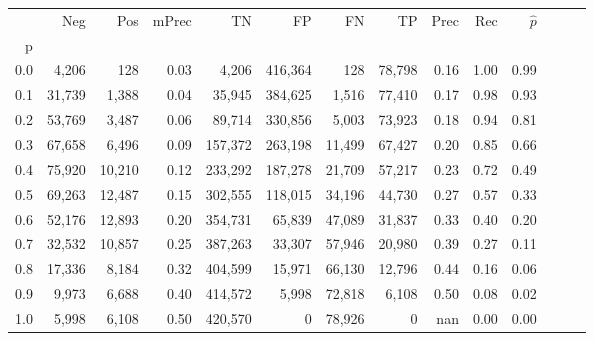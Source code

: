 \begin{tabular}{rrrrrrrrrrrrrr}
\toprule
{} &     Neg &     Pos & mPrec &       TN &       FP &      FN &      TP &  Prec &   Rec & $\hat{p}$ \\
p   &         &         &       &          &          &         &         &       &       &           \\
\midrule
0.0 &   4,206 &     128 &  0.03 &    4,206 &  416,364 &     128 &  78,798 &  0.16 &  1.00 &      0.99 \\
0.1 &  31,739 &   1,388 &  0.04 &   35,945 &  384,625 &   1,516 &  77,410 &  0.17 &  0.98 &      0.93 \\
0.2 &  53,769 &   3,487 &  0.06 &   89,714 &  330,856 &   5,003 &  73,923 &  0.18 &  0.94 &      0.81 \\
0.3 &  67,658 &   6,496 &  0.09 &  157,372 &  263,198 &  11,499 &  67,427 &  0.20 &  0.85 &      0.66 \\
0.4 &  75,920 &  10,210 &  0.12 &  233,292 &  187,278 &  21,709 &  57,217 &  0.23 &  0.72 &      0.49 \\
0.5 &  69,263 &  12,487 &  0.15 &  302,555 &  118,015 &  34,196 &  44,730 &  0.27 &  0.57 &      0.33 \\
0.6 &  52,176 &  12,893 &  0.20 &  354,731 &   65,839 &  47,089 &  31,837 &  0.33 &  0.40 &      0.20 \\
0.7 &  32,532 &  10,857 &  0.25 &  387,263 &   33,307 &  57,946 &  20,980 &  0.39 &  0.27 &      0.11 \\
0.8 &  17,336 &   8,184 &  0.32 &  404,599 &   15,971 &  66,130 &  12,796 &  0.44 &  0.16 &      0.06 \\
0.9 &   9,973 &   6,688 &  0.40 &  414,572 &    5,998 &  72,818 &   6,108 &  0.50 &  0.08 &      0.02 \\
1.0 &   5,998 &   6,108 &  0.50 &  420,570 &        0 &  78,926 &       0 &   nan &  0.00 &      0.00 \\
\bottomrule
\end{tabular}
